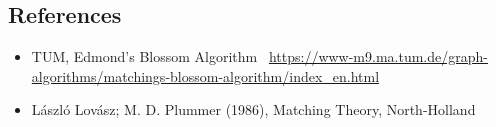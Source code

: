 \documentclass{article}
\begin{document}
\subsection*{References}

\begin{itemize}\itemsep .125cm
	\item TUM, Edmond's Blossom Algorithm ~\url{https://www-m9.ma.tum.de/graph-algorithms/matchings-blossom-algorithm/index_en.html}
	\item László Lovász; M. D. Plummer (1986), Matching Theory, North-Holland
\end{itemize}
\ifx\onefile\undefined
	
\end{document}
